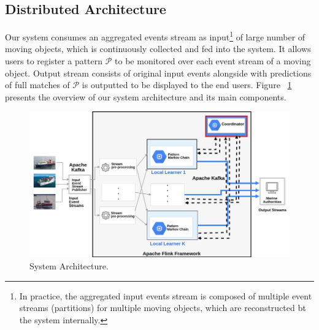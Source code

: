 

\subsection{Distributed Architecture}
\label{sec:architecture}
Our system consumes an aggregated events stream as input\footnote{In practice, the aggregated input events stream is composed of multiple event streams (partitions) for multiple moving objects, which are reconstructed bt the system internally.} of large number of moving objects, which is continuously collected and fed into the system. It allows users to register a pattern $\mathcal{P}$ to be monitored over each event stream of a moving object. Output stream consists of original input events alongside with predictions of full matches of $\mathcal{P}$ is outputted to be displayed to the end users. Figure ~\ref{fig:architecture} presents the overview of our system architecture and its main components.      


\begin{figure}[h]

\includegraphics[width=\linewidth]{figures/distributed_architecture_2.png}
	
\caption{System Architecture.}
\label{fig:architecture}
\end{figure}

